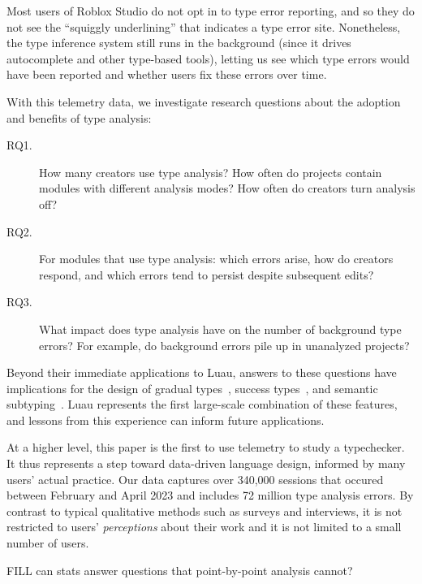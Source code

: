 \documentclass[english,submission,cleveref]{programming}
\begin{document}
Most users of {Roblox Studio} do not opt in to type error
reporting, and so they do not see the ``squiggly underlining'' that
indicates a type error site. Nonetheless, the type inference system
still runs in the background (since it drives autocomplete and other
type-based tools), letting us see which type errors would have
been reported and whether users fix these errors over time.

With this telemetry data, we investigate research questions about
the adoption and benefits of type analysis:
\begin{description}
  \item[RQ1.]
    How many creators use type analysis?
    How often do projects contain modules with different
    analysis modes?
    How often do creators turn analysis off?
  \item[RQ2.]
    For modules that use type analysis:
    which errors arise,
    how do creators respond,
    and which errors tend to persist despite subsequent edits?
  \item[RQ3.]
    What impact does type analysis have on the number of background type
    errors?
    For example, do background errors pile up in unanalyzed projects?
\end{description}

Beyond their immediate applications to {Luau},
answers to these questions have implications for the design
of gradual types~\cite{st-sfp-2006}, success types~\cite{lindahl2006practical},
and semantic subtyping~\cite{CF05:GentleIntroduction,Jef22:SemanticSubtyping}.
Luau represents the first large-scale combination of these features,
and lessons from this experience can inform future applications.

At a higher level, this paper is the first to use telemetry 
to study a typechecker.
It thus represents a step toward data-driven language design,
informed by many users' actual practice.
Our data captures over 340,000 sessions
that occured between February and April 2023
and includes 72 million type analysis errors.
By contrast to typical qualitative methods such as surveys and interviews, it
is not restricted to users' \emph{perceptions} about their work and it is not
limited to a small number of users.

FILL can stats answer questions that point-by-point analysis cannot?
\end{document}
